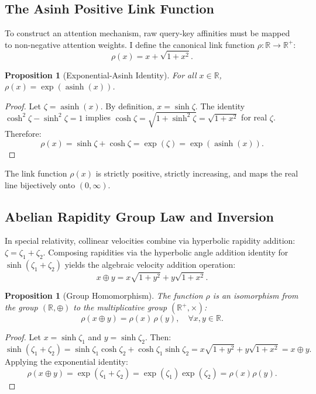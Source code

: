 \documentclass[11pt,a4paper]{article}
\newtheorem{proposition}[theorem]{Proposition}
\theoremstyle{definition}
\newcommand{\asinh}{\operatorname{asinh}}
\begin{document}
\subsection{The Asinh Positive Link Function}
\label{subsec:asinh_link}

To construct an attention mechanism, raw query-key affinities must be mapped to non-negative attention weights. I define the canonical link function $\rho : \mathbb{R} \to \mathbb{R}^+$:
\begin{equation}
\label{eq:rho_def}
\rho(x) = x + \sqrt{1 + x^2}.
\end{equation}
\begin{proposition}[Exponential-Asinh Identity]
For all $x \in \mathbb{R}$, $\rho(x) = \exp(\asinh(x))$.
\end{proposition}
\begin{proof}
Let $\zeta = \asinh(x)$. By definition, $x = \sinh \zeta$. The identity $\cosh^2 \zeta - \sinh^2 \zeta = 1$ implies $\cosh \zeta = \sqrt{1 + \sinh^2 \zeta} = \sqrt{1 + x^2}$ for real $\zeta$. Therefore:
\begin{equation}
\rho(x) = \sinh \zeta + \cosh \zeta = \exp(\zeta) = \exp(\asinh(x)).
\end{equation}
\end{proof}
The link function $\rho(x)$ is strictly positive, strictly increasing, and maps the real line bijectively onto $(0, \infty)$.

\subsection{Abelian Rapidity Group Law and Inversion}
\label{subsec:group_law}

In special relativity, collinear velocities combine via hyperbolic rapidity addition: $\zeta = \zeta_1 + \zeta_2$. Composing rapidities via the hyperbolic angle addition identity for $\sinh(\zeta_1 + \zeta_2)$ yields the algebraic velocity addition operation:
\begin{equation}
x \oplus y = x \sqrt{1 + y^2} + y \sqrt{1 + x^2}.
\end{equation}
\begin{proposition}[Group Homomorphism]
The function $\rho$ is an isomorphism from the group $(\mathbb{R}, \oplus)$ to the multiplicative group $(\mathbb{R}^+, \times)$:
\begin{equation}
\rho(x \oplus y) = \rho(x) \, \rho(y), \quad \forall x, y \in \mathbb{R}.
\end{equation}
\end{proposition}
\begin{proof}
Let $x = \sinh \zeta_1$ and $y = \sinh \zeta_2$. Then:
\begin{equation}
\sinh(\zeta_1 + \zeta_2) = \sinh \zeta_1 \cosh \zeta_2 + \cosh \zeta_1 \sinh \zeta_2 = x \sqrt{1 + y^2} + y \sqrt{1 + x^2} = x \oplus y.
\end{equation}
Applying the exponential identity:
\begin{equation}
\rho(x \oplus y) = \exp(\zeta_1 + \zeta_2) = \exp(\zeta_1) \exp(\zeta_2) = \rho(x) \rho(y).
\end{equation}
\end{proof}
\end{document}
